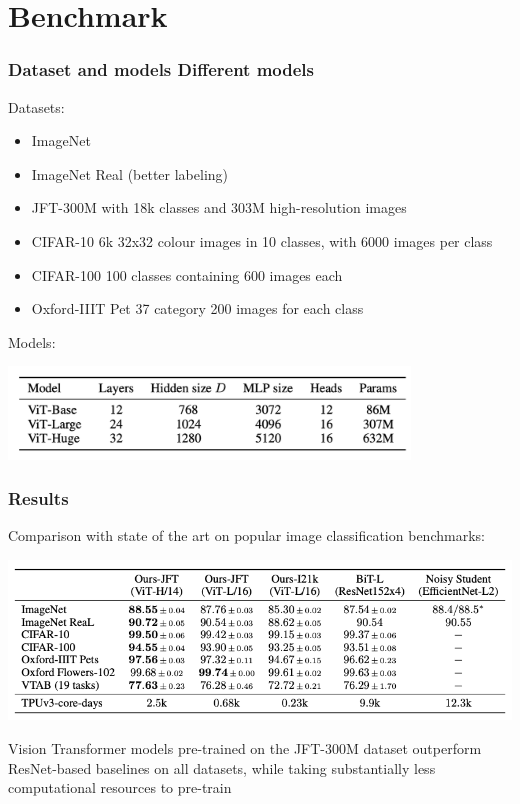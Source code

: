 \section{Benchmark}

\begin{frame}
\frametitle{Dataset and models Different models}
Datasets:
\begin{itemize}
    \item ImageNet
    \item ImageNet Real (better labeling)
    \item JFT-300M with 18k classes and 303M high-resolution images
    \item CIFAR-10 6k 32x32 colour images in 10 classes, with 6000 images per class
    \item CIFAR-100 100 classes containing 600 images each
    \item Oxford-IIIT Pet 37 category 200 images for each class
\end{itemize}
\vspace{0.4cm}

Models:
\begin{center}
    \includegraphics[width=0.8\textwidth]{img/3-section/Varianti VIT.png} 
\end{center}

\end{frame}

\begin{frame}
\frametitle{Results}
Comparison with state of the art on popular image classification benchmarks:
\begin{center}
    \includegraphics[width=1\textwidth]{img/3-section/Simple benchmark.png} 
\end{center}

Vision Transformer models pre-trained on the JFT-300M dataset outperform ResNet-based baselines on all datasets, while taking substantially less computational resources to pre-train

\end{frame}

